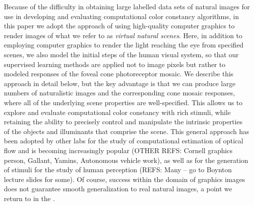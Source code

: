 \documentclass{jov}
\begin{document}
Because of the difficulty in obtaining large labelled data sets of natural images for use in developing and evaluating computational color constancy algorithms, in this paper we adopt the approach of using high-quality computer graphics to render images of what we refer to as {\em virtual natural scenes}. Here, in addition to employing computer graphics to render the light reaching the eye from specified scenes, we also model the initial steps of the human visual system, so that our supervised learning methods are applied not to image pixels but rather to modeled responses of the foveal cone photoreceptor mosaic. We describe this approach in detail below, but the key advantage is that we can produce large numbers of naturalistic images and the corresponding cone mosaic responses, where all of the underlying scene properties are well-specified. This allows us to explore and evaluate computational color constancy with rich stimuli, while retaining the ability to precisely control and manipulate the intrinsic properties of the objects and illuminants that comprise the scene. This general approach has been adopted by other labs for the study of computational estimation of optical flow \cite{baker2011database} and is becoming increasingly popular (OTHER REFS: Cornell graphics person, Gallant, Yamins, Autonomous vehicle work), as well as for the generation of stimuli for the study of human perception (REFS: Many -- go to Boynton lecture slides for some).  Of course, success within the domain of graphics images does not guarantee smooth generalization to real natural images, a point we return to in the .
\end{document}

